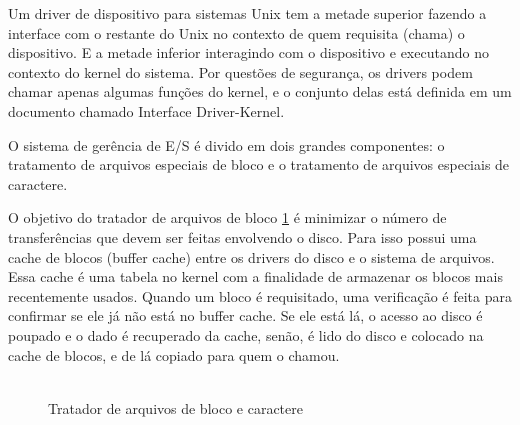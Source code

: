 Um driver de dispositivo para sistemas Unix tem a metade superior fazendo a interface com o restante do Unix no contexto de quem requisita (chama) o dispositivo. E a metade inferior interagindo com o dispositivo e executando no contexto do kernel do sistema. Por questões de segurança, os drivers podem chamar apenas algumas funções do kernel, e o conjunto delas está definida em um documento chamado Interface Driver-Kernel.

O sistema de gerência de E/S é divido em dois grandes componentes: o tratamento de arquivos especiais de bloco e o tratamento de arquivos especiais de caractere.

O objetivo do tratador de arquivos de bloco \ref{fig:tratadores} é minimizar o número de transferências que devem ser feitas envolvendo o disco. Para isso possui uma cache de blocos (buffer cache) entre os drivers do disco e o sistema de arquivos. Essa cache é uma tabela no kernel com a finalidade de armazenar os blocos mais recentemente usados. Quando um bloco é requisitado, uma verificação é feita para confirmar se ele já não está no buffer cache. Se ele está lá, o acesso ao disco é poupado e o dado é recuperado da cache, senão, é lido do disco e colocado na cache de blocos, e de lá copiado para quem o chamou.

\begin{figure}
	\caption{Tratador de arquivos de bloco e caractere}
	\label{fig:tratadores}
	\centerline{
		\includegraphics[width=0,8]{imgs/unixIOsystem.png}
	}
\end{figure}

